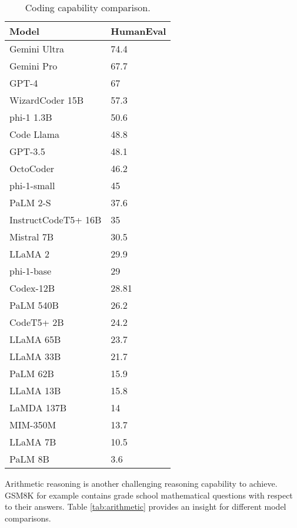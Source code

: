 \documentclass[conference]{IEEEtran}
\begin{document}
\begin{table}[H]
    \centering
    \caption{Coding capability comparison.} \label{tab:coding}
    \begin{tabular}{|l|l|}
    \hline
        Model & HumanEval \\ \hline
Gemini Ultra & 74.4 \\ \hline
Gemini Pro & 67.7 \\ \hline
GPT-4 & 67 \\ \hline
WizardCoder 15B & 57.3 \\ \hline
phi-1 1.3B & 50.6 \\ \hline
Code Llama & 48.8 \\ \hline
GPT-3.5 & 48.1 \\ \hline
OctoCoder & 46.2 \\ \hline
phi-1-small & 45 \\ \hline
PaLM 2-S & 37.6 \\ \hline
InstructCodeT5+ 16B & 35 \\ \hline
Mistral 7B & 30.5 \\ \hline
LLaMA 2 & 29.9 \\ \hline
phi-1-base & 29 \\ \hline
Codex-12B & 28.81 \\ \hline
PaLM 540B & 26.2 \\ \hline
CodeT5+ 2B & 24.2 \\ \hline
LLaMA 65B & 23.7 \\ \hline
LLaMA 33B & 21.7 \\ \hline
PaLM 62B & 15.9 \\ \hline
LLaMA 13B & 15.8 \\ \hline
LaMDA 137B & 14 \\ \hline
MIM-350M & 13.7 \\ \hline
LLaMA 7B & 10.5 \\ \hline
PaLM 8B & 3.6 \\ \hline
    \end{tabular}
\end{table}

Arithmetic reasoning is another challenging reasoning capability to achieve. GSM8K for example contains grade school mathematical questions with respect to their answers. Table \ref{tab:arithmetic} provides an insight for different model comparisons.
\end{document}
